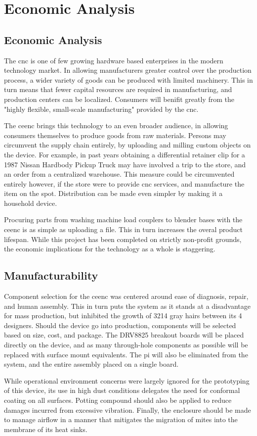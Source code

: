\chapter{Economic Analysis}
\section{Economic Analysis}
The \gls{cnc} is one of few growing hardware based enterprises in the modern technology market.
In allowing manufacturers greater control over the production process, a wider variety of goods can be produced with limited machinery.
This in turn means that fewer capital resources are required in manufacturing, and production centers can be localized.
Consumers will benifit greatly from the "highly flexible, small-scale manufacturing"\cite{3dprintimpact} provided by the \gls{cnc}.

The \gls{ceenc} brings this technology to an even broader audience, in allowing consumers themselves to produce goods from raw materials.
Persons may circumvent the supply chain entirely, by uploading and milling custom objects on the device.\cite{3dprintsave}
For example, in past years obtaining a differential retainer clip for a 1987 Nissan Hardbody Pickup Truck may have involved a trip to the store, and an order from a centralized warehouse.
This measure could be circumvented entirely however, if the store were to provide \gls{cnc} services, and manufacture the item on the spot. 
Distribution can be made even simpler by making it a household device.

Procuring parts from washing machine load couplers to blender bases with the \gls{ceenc} is as simple as uploading a file.
This in turn increases the overal product lifespan.
While this project has been completed on strictly non-profit grounds, the economic implications for the technology as a whole is staggering.

\section{Manufacturability}
Component selection for the \gls{ceenc} was centered around ease of diagnosis, repair, and human assembly.
This in turn puts the system as it stands at a disadvantage for mass production, but inhibited the growth of 3214 gray hairs between its 4 designers.
Should the device go into production, components will be selected based on size, cost, and package. 
The DRV8825 breakout boards will be placed directly on the device, and as many through-hole components as possible will be replaced with surface mount equivalents.
The \gls{pi} will also be eliminated from the system, and the entire assembly placed on a single board.

While operational environment concerns were largely ignored for the prototyping of this device, its use in high dust conditions delegates the need for conformal coating on all surfaces.
Potting compound should also be applied to reduce damages incurred from excessive vibration.
Finally, the enclosure should be made to manage airflow in a manner that mitigates the migration of mites into the membrane of its heat sinks.
